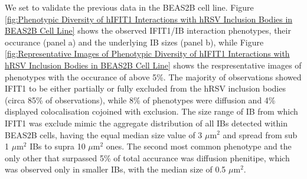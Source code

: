 We set to validate the previous data in the BEAS2B cell line. Figure \ref{fig:Phenotypic Diversity of hIFIT1 Interactions with hRSV Inclusion Bodies in BEAS2B Cell Line} shows the observed IFIT1/IB interaction phenotypes, their occurance (panel a) and the underlying IB sizes (panel b), while Figure \ref{fig:Representative Images of Phenotypic Diversity of hIFIT1 Interactions with hRSV Inclusion Bodies in BEAS2B Cell Line} shows the respresentative images of phenotypes with the occurance of above 5\%. The majority of observations showed IFIT1 to be either partially or fully excluded from the hRSV inclusion bodies (circa 85\% of observations), while 8\% of phenotypes were diffusion and 4\% displayed colocalisation cojoined with exclusion. The size range of IB from which IFIT1 was exclude mimic the aggregate distribution of all IBs detected within BEAS2B cells, having the equal median size value of 3 \(\mu \mbox{m}^2\) and spread from sub 1 \(\mu \mbox{m}^2\) IBs to supra 10 \(\mu \mbox{m}^2\) ones. The second most common phenotype and the only other that surpassed 5\% of total accurance was diffusion phenitipe, which was observed only in smaller IBs, with the median size of 0.5 \(\mu \mbox{m}^2\).


